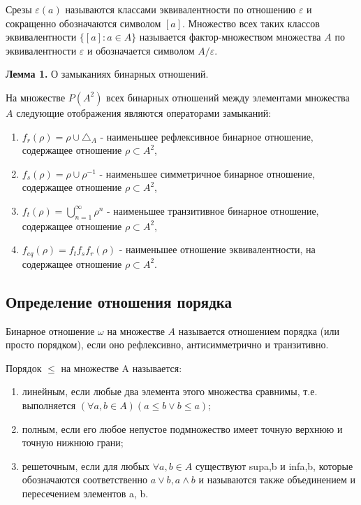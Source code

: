 \documentclass[spec, och, labwork]{shiza}
\begin{document}
        Срезы $\varepsilon(a)$ называются классами эквивалентности по отношению $\varepsilon$ и сокращенно обозначаются символом $[a]$. Множество всех таких классов эквивалентности $\{[a]: a \in A\}$ называется фактор-множеством множества $A$ по эквивалентности $\varepsilon$ и обозначается символом $A/\varepsilon$.

        \textbf{Лемма 1.} О замыканиях бинарных отношений.

        На множестве $P(A^2)$ всех бинарных отношений между элементами множества $A$ следующие отображения являются
        операторами замыканий:

        \begin{enumerate}
            \item $f_r(\rho) = \rho \cup \triangle_A$ - наименьшее рефлексивное бинарное отношение, содержащее отношение
            $\rho \subset A^2$,
            \item $f_s(\rho) = \rho \cup \rho^{-1}$ - наименьшее симметричное бинарное отношение, содержащее отношение
            $\rho \subset A^2$,
            \item $f_t(\rho) = \bigcup^\infty_{n=1} \rho^{n}$ - наименьшее транзитивное бинарное отношение, содержащее
            отношение $\rho \subset A^2$,
            \item $f_{eq}(\rho) = f_t f_s f_r(\rho)$ - наименьшее отношение эквивалентности, на содержащее отношение
            $\rho \subset A^2$.
        \end{enumerate}        

    \subsection{Определение отношения порядка}

        Бинарное отношение $\omega$ на множестве $A$ называется отношением порядка (или просто порядком), если оно
        рефлексивно, антисимметрично и транзитивно.

        Порядок $\leq$ на множестве A называется:

        \begin{enumerate}
        \item линейным, если любые два элемента этого множества
        сравнимы, т.е. выполняется $(\forall a, b \in A) (a \leq b \vee b \leq a)$;

        \item полным, если его любое непустое подмножество имеет
        точную верхнюю и точную нижнюю грани;

        \item решеточным, если для любых $\forall a, b \in A$ существуют sup{a,b} и
        inf{a,b}, которые обозначаются соответственно $a \vee b, a \wedge b$ и
        называются также объединением и пересечением элементов a, b.
        \end{enumerate}
\end{document}

